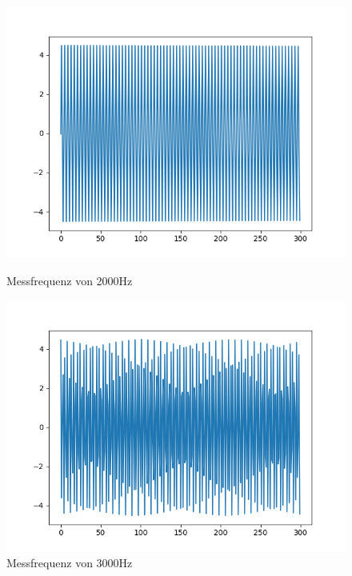 \documentclass[12pt, oneside, a4paper, \docLanguage]{report}
\begin{document}
\begin{figure}[H]
   \begin{minipage}[b]{.5\linewidth} %
      \includegraphics[width=\linewidth]{media/2000Hz}
      \caption{Messfrequenz von 2000Hz}
   \end{minipage}
   \begin{minipage}[b]{.5\linewidth} %
      \includegraphics[width=\linewidth]{media/3000Hz}
      \caption{Messfrequenz von 3000Hz}
   \end{minipage}
\end{figure}
\end{document}
